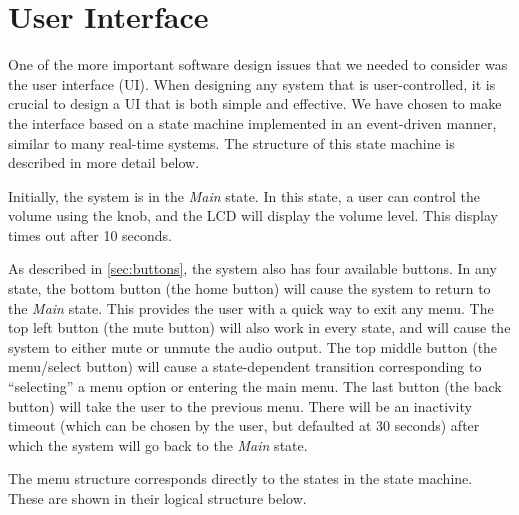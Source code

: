 \section{User Interface}
\label{sec:ui}

One of the more important software design issues that we needed to consider was the user interface (UI). When designing any system that is user-controlled, it is crucial to design a UI that is both simple and effective. We have chosen to make the interface based on a state machine implemented in an event-driven manner, similar to many real-time systems. The structure of this state machine is described in more detail below.

Initially, the system is in the \emph{Main} state. In this state, a user can control the volume using the knob, and the LCD will display the volume level. This display times out after 10 seconds.

As described in \autoref{sec:buttons}, the system also has four available buttons. In any state, the bottom button (the home button) will cause the system to return to the \emph{Main} state. This provides the user with a quick way to exit any menu. The top left button (the mute button) will also work in every state, and will cause the system to either mute or unmute the audio output. The top middle button (the menu/select button) will cause a state-dependent transition corresponding to ``selecting'' a menu option or entering the main menu. The last button (the back button) will take the user to the previous menu. There will be an inactivity timeout (which can be chosen by the user, but defaulted at 30 seconds) after which the system will go back to the \emph{Main} state.

The menu structure corresponds directly to the states in the state machine. These are shown in their logical structure below.

